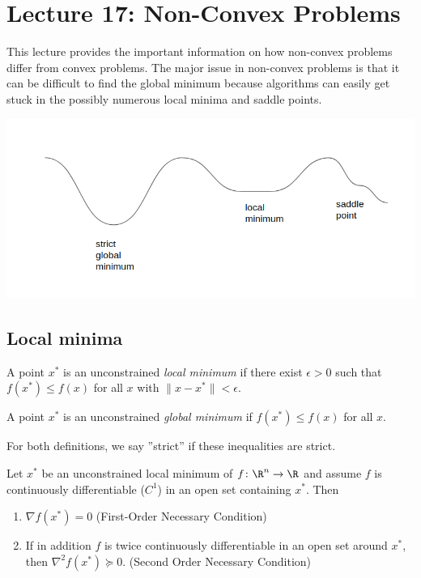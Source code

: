 

\section{Lecture 17: Non-Convex Problems}

This lecture provides the important information on how non-convex problems differ from convex problems. The major issue in non-convex problems is that it can be difficult to find the global minimum because algorithms can easily get stuck in the possibly numerous local minima and saddle points.

\begin{center}
\includegraphics[width=1.0\linewidth, height=0.4\linewidth]{figures/lecture_17_non_convex_graph.png} 
\end{center}

\subsection{Local minima}

\begin{definition}
A point $x^*$ is an unconstrained \textit{local minimum} if there exist $\epsilon > 0$ such that $f(x^*) \le f(x)$ for all $x$ with $\|x - x^*\| < \epsilon$.
\end{definition}

\begin{definition}
A point $x^*$ is an unconstrained \textit{global minimum} if $f(x^*) \le f(x)$ for all $x$.
\end{definition}

For both definitions, we say ''strict'' if these inequalities are strict.

\begin{proposition}
Let $x^*$ be an unconstrained local minimum of $f\colon \R^n \to\R$ and assume $f$ is continuously differentiable ($C^1$) in an open set containing $x^*$. Then
\begin{enumerate}
    \item $\nabla f(x^*) = 0$ (First-Order Necessary Condition)
    \item If in addition $f$ is twice continuously differentiable in an open set around $x^*$, then $\nabla^2f(x^*) \succeq 0$. (Second Order Necessary Condition)
\end{enumerate}
\end{proposition}

